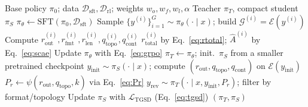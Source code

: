 \begin{algorithm}[t]
\small
\caption{\framework Training Pipeline}
\label{alg:topoprm}
\begin{algorithmic}[1]
\Require Base policy $\pi_0$; data $\mathcal{D}_{\mathrm{sft}},\mathcal{D}_{\mathrm{rl}}$; weights $w_o,w_f,w_l,\alpha$
\Ensure Teacher $\pi_T$, compact student $\pi_S$
\State $\pi_\theta\!\leftarrow\!\mathrm{SFT}(\pi_0,\mathcal{D}_{\mathrm{sft}})$ 
 
  \State Sample $\{y^{(i)}\}_{i=1}^{G}\!\sim\!\pi_\theta(\cdot\!\mid\!x)$; build $\mathcal{G}^{(i)}\!=\!\mathcal{E}(y^{(i)})$
  \State Compute $r_{\mathrm{out}}^{(i)},r_{\mathrm{fmt}}^{(i)},r_{\mathrm{len}}^{(i)},q_{\mathrm{topo}}^{(i)},q_{\mathrm{cont}}^{(i)}$
  \State $r_{\mathrm{total}}^{(i)}$ by Eq.~\ref{eq:rtotal}; $\widehat{A}^{(i)}$ by Eq.~\ref{eq:scae}
  \State Update $\pi_\theta$ with Eq.~\ref{eq:grpo}
\EndFor
\State $\pi_T\!\leftarrow\!\pi_\theta$; init.\ $\pi_S$ from a smaller pretrained checkpoint
 
  \State $y_{\mathrm{init}}\!\sim\!\pi_S(\cdot\!\mid\!x)$; compute $(r_{\mathrm{out}},q_{\mathrm{topo}},q_{\mathrm{cont}})$ on $\mathcal{E}(y_{\mathrm{init}})$
  \State $P_r\!\leftarrow\!\psi(r_{\mathrm{out}},q_{\mathrm{topo}},k)$ via Eq.~\ref{eq:Pr}
  \State $y_{\mathrm{rev}}\!\sim\!\pi_T(\cdot\!\mid\!x,y_{\mathrm{init}},P_r)$; filter by format/topology
  \State Update $\pi_S$ with $\mathcal{L}_{\mathrm{TGSD}}$ (Eq.~\ref{eq:tgsd})
\EndFor
\State \Return $(\pi_T,\pi_S)$
\end{algorithmic}
\end{algorithm}